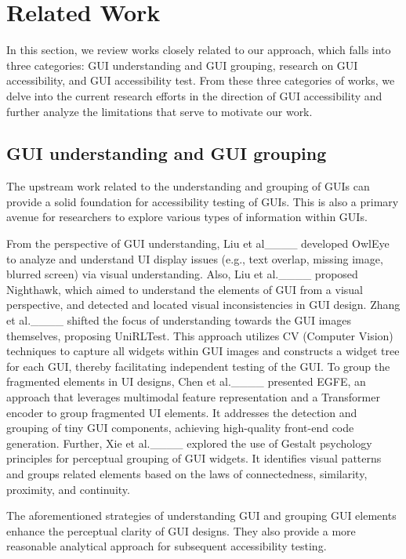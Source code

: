 \section{Related Work}
\label{sec: related work}
In this section, we review works closely related to our approach, which falls into three categories: GUI understanding and GUI grouping, research on GUI accessibility, and GUI accessibility test.
From these three categories of works, we delve into the current research efforts in the direction of GUI accessibility and further analyze the limitations that serve to motivate our work.
\vspace{-0.42em}

\subsection{GUI understanding and GUI grouping}
The upstream work related to the understanding and grouping of GUIs can provide a solid foundation for accessibility testing of GUIs. 
This is also a primary avenue for researchers to explore various types of information within GUIs. 

From the perspective of GUI understanding, Liu et al____ developed OwlEye to analyze and understand UI display issues (e.g., text overlap, missing image, blurred screen) via visual understanding.
Also, Liu et al.____ proposed Nighthawk, which aimed to understand the elements of GUI from a visual perspective, and detected and located visual inconsistencies in GUI design.
Zhang et al.____ shifted the focus of understanding towards the GUI images themselves, proposing UniRLTest. 
This approach utilizes CV (Computer Vision) techniques to capture all widgets within GUI images and constructs a widget tree for each GUI, thereby facilitating independent testing of the GUI.
To group the fragmented elements in UI designs, Chen et al.____ presented EGFE, an approach that leverages multimodal feature representation and a Transformer encoder to group fragmented UI elements. 
It addresses the detection and grouping of tiny GUI components, achieving high-quality front-end code generation.
Further, Xie et al.____ explored the use of Gestalt psychology principles for perceptual grouping of GUI widgets. 
It identifies visual patterns and groups related elements based on the laws of connectedness, similarity, proximity, and continuity.

The aforementioned strategies of understanding GUI and grouping GUI elements enhance the perceptual clarity of GUI designs. 
They also provide a more reasonable analytical approach for subsequent accessibility testing.



